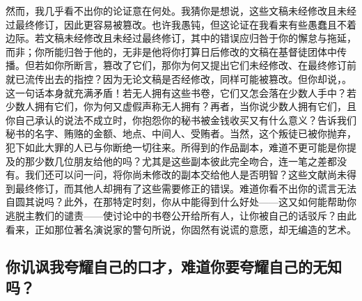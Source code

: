 然而，我几乎看不出你的论证意在何处。我猜你是想说，这些文稿未经修改且未经过最终修订，因此更容易被篡改。也许我愚钝，但这论证在我看来有些愚蠢且不着边际。若文稿未经修改且未经过最终修订，其中的错误应归咎于你的懈怠与拖延，而非；你所能归咎于他的，无非是他将你打算日后修改的文稿在基督徒团体中传播。但若如你所断言，篡改了它们，那你为何又提出它们未经修改、在最终修订前就已流传出去的指控？因为无论文稿是否经修改，同样可能被篡改。但你却说，。这一句话本身就充满矛盾！若无人拥有这些书卷，它们又怎会落在少数人手中？若少数人拥有它们，你为何又虚假声称无人拥有？再者，当你说少数人拥有它们，且你自己承认的说法不成立时，你抱怨你的秘书被金钱收买又有什么意义？告诉我们秘书的名字、贿赂的金额、地点、中间人、受贿者。当然，这个叛徒已被你抛弃，犯下如此大罪的人已与你断绝一切往来。所得到的作品副本，难道不更可能是你提及的那少数几位朋友给他的吗？尤其是这些副本彼此完全吻合，连一笔之差都没有。我们还可以问一问，将你尚未修改的副本交给他人是否明智？这些文献尚未得到最终修订，而其他人却拥有了这些需要修正的错误。难道你看不出你的谎言无法自圆其说吗？此外，在那特定时刻，你从中能得到什么好处——这又如何能帮助你逃脱主教们的谴责——使讨论中的书卷公开给所有人，让你被自己的话驳斥？由此看来，正如那位著名演说家的警句所说，你固然有说谎的意愿，却无编造的艺术。\par


\subsection{你讥讽我夸耀自己的口才，难道你要夸耀自己的无知吗？}

